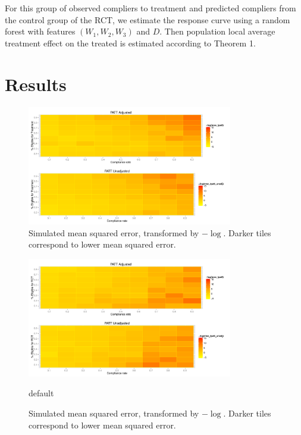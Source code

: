 \documentclass{article}
\theoremstyle{plain}
\begin{document}
For this group of observed compliers to treatment and predicted compliers from the control group of the RCT, we estimate the response curve using a random forest with features $(W_1, W_2, W_3)$ and $D$.  Then population local average treatment effect on the treated is estimated according to Theorem 1.


\section{Results}

\begin{figure}[htbp]
\begin{center}
\includegraphics[width = 0.8\textwidth]{mse_ratec_ratet}
\caption{Simulated mean squared error, transformed by $-\log$. Darker tiles correspond to lower mean squared error.}
\label{default}
\end{center}
\end{figure}
\begin{figure}[htbp]
\begin{center}
\includegraphics[width = 0.8\textwidth]{mse_ratec_rates}
\caption{default}
\caption{Simulated mean squared error, transformed by $-\log$. Darker tiles correspond to lower mean squared error.}
\end{center}
\end{figure}
\end{document}
